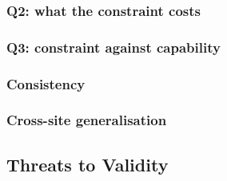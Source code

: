 \subsubsection{Q2: what the constraint costs}\label{sec:eval:results:q2}


\subsubsection{Q3: constraint against capability}\label{sec:eval:results:q3}


\subsubsection{Consistency}\label{sec:eval:results:consistency}


\subsubsection{Cross-site generalisation}\label{sec:eval:results:b2}


\subsection{Threats to Validity}\label{sec:eval:threats}


